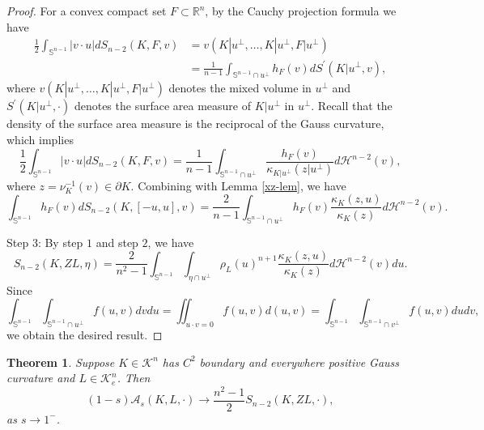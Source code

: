 \documentclass[12pt, oneside,reqno]{amsart}
\numberwithin{equation}{section}
\newtheorem{theorem}{Theorem}[section]
\newtheorem{definition and theorem}[theorem]{Definition and Theorem}
\theoremstyle{plain}
\theoremstyle{remark}
\theoremstyle{definition}
\newcommand{\sn}{{\mathbb S}^{n-1}}
\newcommand{\rn}{\mathbb R^n}
\newcommand{\tk}{\mathcal{K}}
\newcommand{\tH}{\mathcal{H}}
\begin{document}
\begin{proof}
    For a convex compact set $F\subset \rn$, by the Cauchy projection formula we have
    \begin{align*}
        \frac{1}{2}\int_{\sn}| v\cdot u | dS_{n-2}(K,F,v)&=v(K|u^{\perp},\ldots, K|u^{\perp}, F|u^{\perp})\\
        &=\frac{1}{n-1}\int_{\sn\cap u^{\perp}}h_F(v)dS^{\prime}(K|u^{\perp},v),
    \end{align*}
    where $v(K|u^{\perp},\ldots, K|u^{\perp}, F|u^{\perp})$ denotes the mixed volume in $u^{\perp}$ and  $S^{\prime}(K|u^{\perp},\cdot)$ denotes the surface area measure of $K|u^{\perp}$ in $u^{\perp}$. Recall that the density of the surface area measure is the reciprocal of the Gauss curvature, which implies
    \[\frac{1}{2}\int_{\sn}| v\cdot u | dS_{n-2}(K,F,v)=\frac{1}{n-1}\int_{\sn\cap u^{\perp}}\frac{h_F(v)}{\kappa_{K|u^{\perp}}(z|u^{\perp})}d\tH^{n-2}(v),\]
    where $z=\nu_K^{-1}(v)\in\partial K$.  
    Combining with Lemma \ref{xz-lem}, we have
    \[\int_{\sn}h_F(v)dS_{n-2}(K,[-u,u],v)=\frac{2}{n-1}\int_{\sn\cap u^{\perp}}h_F(v)\frac{\kappa_K(z,u)}{\kappa_{K}(z)}d\tH^{n-2}(v).\]

    Step 3: By step $1$ and step $2$, we have
    \[S_{n-2}(K,ZL,\eta)=\frac{2}{n^2-1}\int_{\sn}\int_{\eta\cap u^{\perp}}\rho_L(u)^{n+1}\frac{\kappa_K(z,u)}{\kappa_K(z)}d\tH^{n-2}(v)du.\]
    Since
    \[\int_{\sn}\int_{\sn\cap u^{\perp}}f(u,v)dvdu=\iint_{u\cdot v=0}f(u,v)d(u,v)=\int_{\sn}\int_{\sn\cap v^{\perp}}f(u,v)dudv,\]
    we obtain the desired result.
\end{proof}
 
\begin{theorem}\label{lim 1} 
Suppose $K\in\tk^n$ has $C^2$ boundary and everywhere positive Gauss curvature and $L\in\tk_e^n$. Then
    \[(1-s)\mathcal{A}_s(K,L,\cdot)\rightarrow \frac{n^2-1}{2}S_{n-2}(K,ZL,\cdot),\]
as $s\rightarrow 1^-$.
\end{theorem}
\end{document}
